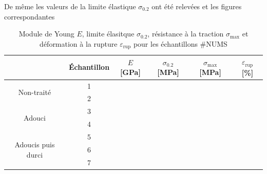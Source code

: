 De même les valeurs de la limite élastique $\sigma_{0.2}$ ont été relevées et les figures correspondantes


\begin{table}[h]
    \centering
    \begin{tabular}{ |c||c|c|c|c|c| }
        \cline{2-6}
        \multicolumn{1}{c|}{} & Échantillon & \(E\) [GPa] & \(\sigma_{0.2}\) [MPa] & \(\sigma_{\textrm{max}}\) [MPa] & \(\varepsilon_{\textrm{rup}}\) [\%] \\
        \hline
        \multirow{2}{4cm}{Non-traité} & 1 &  &  &  &  \\
        & 2 &  &  &  &  \\
        \hline
        \multirow{2}{4cm}{Adouci} & 3 &  &  &  &  \\
        & 4 &  &  &  &  \\
        \hline
        \multirow{3}{4cm}{Adoucis puis durci} & 5 &  &  &  &  \\
        & 6 &  &  &  &  \\
        & 7 &  &  &  &  \\
        \hline
    \end{tabular}
    \caption{Module de Young \(E\), limite élasitque \(\sigma_{0.2}\), résistance à la traction \(\sigma_{\textrm{max}}\) et déformation à la rupture \(\varepsilon_{\textrm{rup}}\) pour les échantillons \#NUMS}
    \label{tab:results}
\end{table}



